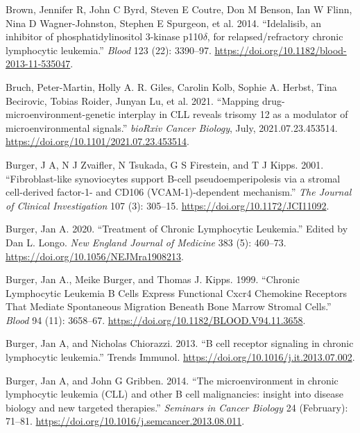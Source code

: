 \documentclass[11pt, a4paper, twosided]{book}
\newenvironment{CSLReferences}%
  {}%
  {\par}
\begin{document}
\begin{CSLReferences}{1}{0}
\leavevmode{}%
Brown, Jennifer R, John C Byrd, Steven E Coutre, Don M Benson, Ian W Flinn, Nina D Wagner-Johnston, Stephen E Spurgeon, et al. 2014. {``{Idelalisib, an inhibitor of phosphatidylinositol 3-kinase p110\(\delta\), for relapsed/refractory chronic lymphocytic leukemia}.''} \emph{Blood} 123 (22): 3390--97. \url{https://doi.org/10.1182/blood-2013-11-535047}.

\leavevmode{}%
Bruch, Peter-Martin, Holly A. R. Giles, Carolin Kolb, Sophie A. Herbst, Tina Becirovic, Tobias Roider, Junyan Lu, et al. 2021. {``{Mapping drug-microenvironment-genetic interplay in CLL reveals trisomy 12 as a modulator of microenvironmental signals}.''} \emph{bioRxiv Cancer Biology}, July, 2021.07.23.453514. \url{https://doi.org/10.1101/2021.07.23.453514}.

\leavevmode{}%
Burger, J A, N J Zvaifler, N Tsukada, G S Firestein, and T J Kipps. 2001. {``{Fibroblast-like synoviocytes support B-cell pseudoemperipolesis via a stromal cell-derived factor-1- and CD106 (VCAM-1)-dependent mechanism.}''} \emph{The Journal of Clinical Investigation} 107 (3): 305--15. \url{https://doi.org/10.1172/JCI11092}.

\leavevmode{}%
Burger, Jan A. 2020. {``{Treatment of Chronic Lymphocytic Leukemia}.''} Edited by Dan L. Longo. \emph{New England Journal of Medicine} 383 (5): 460--73. \url{https://doi.org/10.1056/NEJMra1908213}.

\leavevmode{}%
Burger, Jan A., Meike Burger, and Thomas J. Kipps. 1999. {``{Chronic Lymphocytic Leukemia B Cells Express Functional Cxcr4 Chemokine Receptors That Mediate Spontaneous Migration Beneath Bone Marrow Stromal Cells}.''} \emph{Blood} 94 (11): 3658--67. \url{https://doi.org/10.1182/BLOOD.V94.11.3658}.

\leavevmode{}%
Burger, Jan A, and Nicholas Chiorazzi. 2013. {``{B cell receptor signaling in chronic lymphocytic leukemia}.''} Trends Immunol. \url{https://doi.org/10.1016/j.it.2013.07.002}.

\leavevmode{}%
Burger, Jan A, and John G Gribben. 2014. {``{The microenvironment in chronic lymphocytic leukemia (CLL) and other B cell malignancies: insight into disease biology and new targeted therapies.}''} \emph{Seminars in Cancer Biology} 24 (February): 71--81. \url{https://doi.org/10.1016/j.semcancer.2013.08.011}.


\end{CSLReferences}
\end{document}
